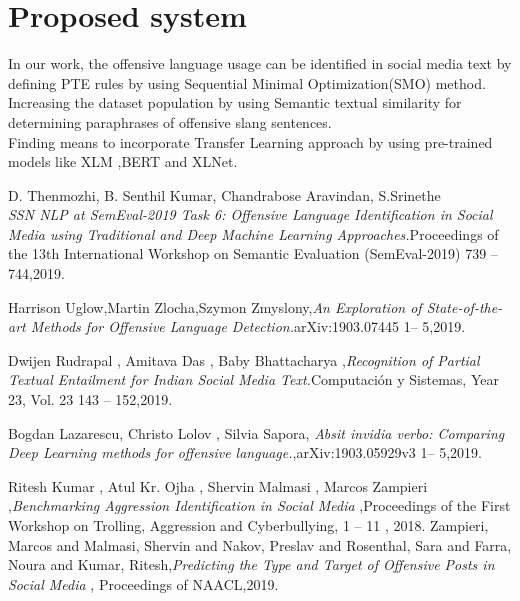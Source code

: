 \documentclass[12pt,a4paper]{article}
\begin{document}
\section{Proposed system}
  In our work, the offensive language usage can be identified in social media text by defining PTE rules by using Sequential Minimal Optimization(SMO) method.\\
  Increasing the dataset population by using Semantic textual similarity for determining paraphrases of offensive slang sentences.\\
  Finding means to incorporate Transfer Learning approach by using pre-trained models like XLM ,BERT and XLNet. 

\begin{thebibliography}{99}
	
	
	D. Thenmozhi, B. Senthil Kumar, Chandrabose Aravindan, S.Srinethe\\{\em SSN NLP at SemEval-2019 Task 6: Offensive Language Identification in Social Media using Traditional and Deep Machine Learning Approaches.}Proceedings of the 13th International Workshop on Semantic Evaluation (SemEval-2019) 739 -- 744,2019.	
	
	Harrison Uglow,Martin Zlocha,Szymon Zmyslony,{\em An Exploration of State-of-the-art Methods for Offensive Language Detection.}arXiv:1903.07445 1-- 5,2019.

	\newpage

	Dwijen Rudrapal , Amitava Das  , Baby Bhattacharya ,{\em Recognition of Partial Textual Entailment for Indian Social Media Text.}Computación y Sistemas, Year 23, Vol. 23  143 -- 152,2019.
	
	 Bogdan Lazarescu, Christo Lolov , Silvia Sapora, {\em Absit invidia verbo: Comparing Deep Learning methods for offensive language.},arXiv:1903.05929v3 1-- 5,2019.
	
	Ritesh Kumar
	, Atul Kr. Ojha , Shervin Malmasi , Marcos Zampieri ,{\em Benchmarking Aggression Identification in Social Media} ,Proceedings of the First Workshop on Trolling, Aggression and Cyberbullying,  1 -- 11 , 2018.
	 Zampieri, Marcos and Malmasi, Shervin and Nakov, Preslav and Rosenthal, Sara and Farra, Noura and Kumar, Ritesh,{\em Predicting the Type and Target of Offensive Posts in Social Media} ,  Proceedings of NAACL,2019.
\end{thebibliography}
	
\end{document}
